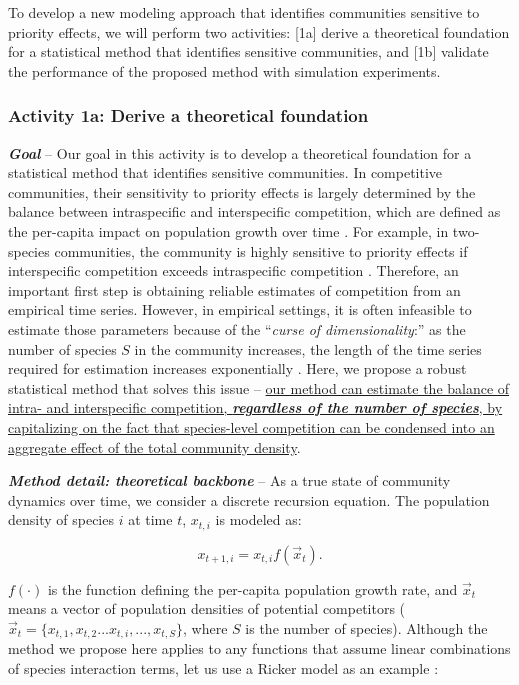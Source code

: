\documentclass[12pt, class=article, crop=false]{standalone}
\begin{document}
To develop a new modeling approach that identifies communities sensitive to priority effects, we will perform two activities:
[1a] derive a theoretical foundation for a statistical method that identifies sensitive communities, and [1b] validate the performance of the proposed method with simulation experiments.

\subsubsection*{Activity 1a: Derive a theoretical foundation}

\textbf{\textit{Goal}} -- 
Our goal in this activity is to develop a theoretical foundation for a statistical method that identifies sensitive communities.
In competitive communities, their sensitivity to priority effects is largely determined by the balance between intraspecific and interspecific competition, which are defined as the per-capita impact on population growth over time \citep{chesson_mechanisms_2000, barabas_chessons_2018, ke_coexistence_2018, terui_intentional_2023}.
For example, in two-species communities, the community is highly sensitive to priority effects if interspecific competition exceeds intraspecific competition \citep{ke_coexistence_2018}.
Therefore, an important first step is obtaining reliable estimates of competition from an empirical time series.
However, in empirical settings, it is often infeasible to estimate those parameters because of the ``\textit{curse of dimensionality}:'' as the number of species $S$ in the community increases, the length of the time series required for estimation increases exponentially \citep{ovaskainen_how_2017}.
Here, we propose a robust statistical method that solves this issue -- \ul{our method can estimate the balance of intra- and interspecific competition, \textbf{\textit{regardless of the number of species}}, by capitalizing on the fact that species-level competition can be condensed into an aggregate effect of the total community density}.

\textbf{\textit{Method detail: theoretical backbone}} -- 
As a true state of community dynamics over time, we consider a discrete recursion equation. The population density of species $i$ at time $t$, $x_{t,i}$ is modeled as:

\begin{equation}
\label{eq:m0}
x_{t + 1, i} = x_{t, i} f(\overset{\rightarrow}{x}_{t}).
\end{equation}

$f(\cdot)$ is the function defining the per-capita population growth rate, and $\overset{\rightarrow}{x}_{t}$ means a vector of population densities of potential competitors ($\overset{\rightarrow}{x}_{t} = \{x_{t,1}, x_{t,2}...x_{t,i},...,x_{t,S}\}$, where $S$ is the number of species).
Although the method we propose here applies to any functions that assume linear combinations of species interaction terms, let us use a Ricker model as an example \citep{ricker_stock_1954, fowler_species_2012, terui_intentional_2023}:
\end{document}
